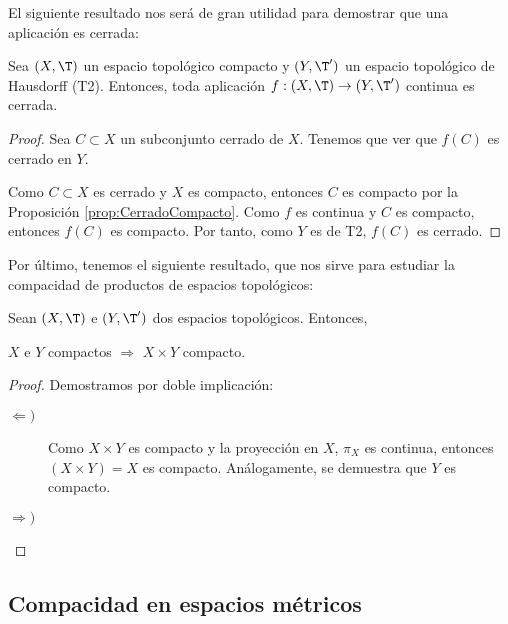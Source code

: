 El siguiente resultado nos será de gran utilidad para demostrar que una aplicación es cerrada:
\begin{teo}\label{teo:ContinuaEntoncesCerrada}
    Sea $(X,\T)$ un espacio topológico compacto y $(Y,\T')$ un espacio topológico de Hausdorff (T2).
    Entonces, toda aplicación $f:(X,\T)\to (Y,\T')$ continua es cerrada.
\end{teo}
\begin{proof}
    Sea $C\subset X$ un subconjunto cerrado de $X$. Tenemos que ver que $f(C)$ es cerrado en $Y$.
    
    Como $C\subset X$ es cerrado y $X$ es compacto, entonces $C$ es compacto por la Proposición \ref{prop:CerradoCompacto}.
    Como $f$ es continua y $C$ es compacto, entonces $f(C)$ es compacto. Por tanto, como $Y$ es de T2, $f(C)$ es cerrado.
\end{proof}


Por último, tenemos el siguiente resultado, que nos sirve para estudiar la compacidad de productos de espacios topológicos:
\begin{teo}[Tychonoff] \label{teo:Tychonoff}
    Sean $(X,\T)$ e $(Y,\T')$ dos espacios topológicos. Entonces,
    \begin{center}
        $X$ e $Y$ compactos $\Longrightarrow$ $X\times Y$ compacto.
    \end{center}
\end{teo}
\begin{proof}
    Demostramos por doble implicación:
    \begin{description}
        \item[$\Longleftarrow)$] Como $X\times Y$ es compacto y la proyección en $X$, $\pi_X$ es continua, entonces $(X\times Y)=X$ es compacto.
        Análogamente, se demuestra que $Y$ es compacto.
        
        \item[$\Longrightarrow)$] %
    \end{description}
\end{proof}


\subsection{Compacidad en espacios métricos}

